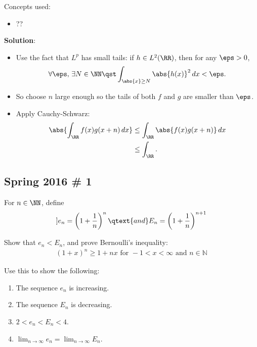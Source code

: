\begin{solution}

Concepts used:

\begin{itemize}
\tightlist
\item
  ??
\end{itemize}

\textbf{Solution}:

\begin{itemize}
\item
  Use the fact that \(L^p\) has small tails: if \(h\in L^2(\RR)\), then
  for any \(\eps > 0\),
  \begin{align*}  
  \forall \eps,\, \exists N\in \NN \qst \int_{\abs{x} \geq {N}} \abs{h(x)}^2 \,dx < \eps
  .\end{align*} 
\item
  So choose \(n\) large enough so the tails of both \(f\) and \(g\) are
  smaller than \(\eps\).
\item
  Apply Cauchy-Schwarz:
  \begin{align*}  
  \abs{\int_\RR f(x) g(x+n) \,dx} 
  &\leq \int_\RR \abs{f(x) g(x+n)}\,dx \\
  &\leq \int_\RR
  .\end{align*}
\end{itemize}

\end{solution}

\hypertarget{spring-2016-1}{%
\subsection{Spring 2016 \# 1}\label{spring-2016-1}}

For \(n\in \NN\), define
\begin{align*}]
e_{n} = \left (1+ {1\over n} \right)^{n} 
\qtext{and}
E_{n} = \left( 1+ {1\over n} \right)^{n+1}
\end{align*}

Show that \(e_n < E_n\), and prove Bernoulli's inequality:
\begin{align*}
(1+x)^{n} \geq 1+n x \text { for }-1<x<\infty \text { and } n \in \mathbb{N}
\end{align*}

Use this to show the following:

\begin{enumerate}
\def\labelenumi{\arabic{enumi}.}
\tightlist
\item
  The sequence \(e_n\) is increasing.
\item
  The sequence \(E_n\) is decreasing.
\item
  \(2 < e_n < E_n < 4\).
\item
  \(\lim _{n \to \infty} e_{n} = \lim _{n \to \infty} E_{n}\).
\end{enumerate}

